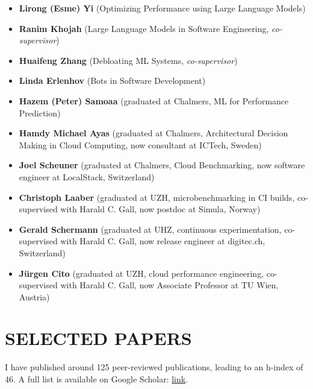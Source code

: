 \documentclass[paper=letter,fontsize=11pt]{scrartcl} %
\newcommand{\NewPart}[2]{\section*{\uppercase{#1} #2}}
\begin{document}
\begin{itemize}
  \itemsep0em   
\item \textbf{Lirong (Esme) Yi} (Optimizing Performance using Large Language Models)
\item \textbf{Ranim Khojah} (Large Language Models in Software Engineering, \emph{co-supervisor})
\item \textbf{Huaifeng Zhang}  (Debloating ML Systems, \emph{co-supervisor})  
\item \textbf{Linda Erlenhov}  (Bots in Software Development)
\item \textbf{Hazem (Peter) Samoaa}  (graduated at Chalmers, ML for Performance Prediction)
\item \textbf{Hamdy Michael Ayas}  (graduated at Chalmers, Architectural Decision Making in Cloud Computing, now consultant at ICTech, Sweden)
\item \textbf{Joel Scheuner}  (graduated at Chalmers, Cloud Benchmarking, now software engineer at LocalStack, Switzerland)
\item \textbf{Christoph Laaber} (graduated at UZH, microbenchmarking in CI builds, co-supervised with Harald C. Gall, now postdoc at Simula, Norway)
\item \textbf{Gerald Schermann} (graduated at UHZ, continuous experimentation, co-supervised with Harald C. Gall, now release engineer at digitec.ch, Switzerland)
\item \textbf{J\"urgen Cito} (graduated at UZH, cloud performance engineering, co-supervised with Harald C. Gall, now Associate Professor at TU Wien, Austria)
\end{itemize}

\NewPart{Selected Papers}{}

I have published around 125 peer-reviewed publications, leading to an h-index of 46. A full list is available on Google Scholar: \href{https://scholar.google.ch/citations?user=wZ9f8CAAAAAJ}{link}.
\end{document}
